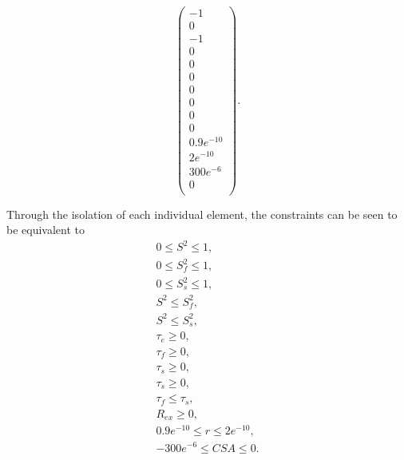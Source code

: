 \begin{htmlonly}
\begin{htmlonly}
\begin{equation}
\begin{pmatrix}
        -1 \\
        0 \\
        -1 \\
        0 \\
        0 \\
        0 \\
        0 \\
        0 \\
        0 \\
        0 \\
        0.9e^{-10} \\
        2e^{-10} \\
        300e^{-6} \\
        0 \\
    \end{pmatrix}.
\end{equation}

\noindent  Through the isolation of each individual element, the constraints can be seen to be equivalent to
\begin{subequations}
\begin{gather} 
    0 \leqslant S^2 \leqslant 1, \\
    0 \leqslant S^2_f \leqslant 1, \\
    0 \leqslant S^2_s \leqslant 1, \\
    S^2 \leqslant S^2_f, \\
    S^2 \leqslant S^2_s, \\
    \tau_e \geqslant 0, \\
    \tau_f \geqslant 0, \\
    \tau_s \geqslant 0, \\
    \tau_s \geqslant 0, \\
    \tau_f \leqslant \tau_s, \\
    R_{ex} \geqslant 0, \\
    0.9e^{-10} \leqslant r \leqslant 2e^{-10}, \\
    -300e^{-6} \leqslant CSA \leqslant 0.
\end{gather} 
\end{subequations}


\end{htmlonly}
\end{htmlonly}
